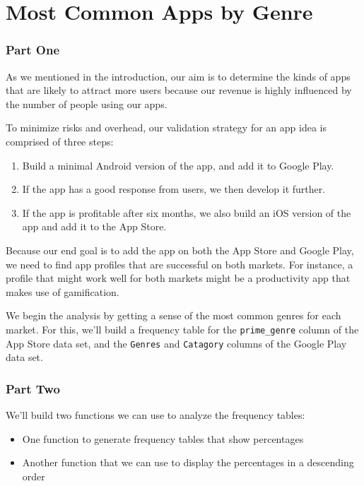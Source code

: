 \documentclass[11pt]{article}
\providecommand{\tightlist}{%
      \setlength{\itemsep}{0pt}\setlength{\parskip}{0pt}}
\begin{document}
    \section{Most Common Apps by Genre}\label{most-common-apps-by-genre}

    \subsubsection{Part One}\label{part-one}

    As we mentioned in the introduction, our aim is to determine the kinds
of apps that are likely to attract more users because our revenue is
highly influenced by the number of people using our apps.

    To minimize risks and overhead, our validation strategy for an app idea
is comprised of three steps:

    \begin{enumerate}
\def\labelenumi{\arabic{enumi}.}
\tightlist
\item
  Build a minimal Android version of the app, and add it to Google Play.
\item
  If the app has a good response from users, we then develop it further.
\item
  If the app is profitable after six months, we also build an iOS
  version of the app and add it to the App Store.
\end{enumerate}

    Because our end goal is to add the app on both the App Store and Google
Play, we need to find app profiles that are successful on both markets.
For instance, a profile that might work well for both markets might be a
productivity app that makes use of gamification.

    We begin the analysis by getting a sense of the most common genres for
each market. For this, we'll build a frequency table for the
\texttt{prime\_genre} column of the App Store data set, and the
\texttt{Genres} and \texttt{Catagory} columns of the Google Play data
set.

    \subsubsection{Part Two}\label{part-two}

    We'll build two functions we can use to analyze the frequency tables:

    \begin{itemize}
\tightlist
\item
  One function to generate frequency tables that show percentages
\item
  Another function that we can use to display the percentages in a
  descending order
\end{itemize}
\end{document}
